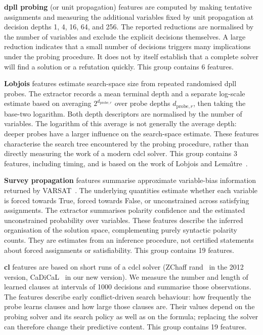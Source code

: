 \noindent\textbf{\gls{dpll} probing} (or unit propagation) features are computed by making tentative assignments and measuring the additional variables fixed by unit propagation at decision depths 1, 4, 16, 64, and 256. The reported reductions are normalised by the number of variables and exclude the explicit decisions themselves. A large reduction indicates that a small number of decisions triggers many implications under the probing procedure. It does not by itself establish that a complete solver will find a solution or a refutation quickly. This group contains 6 features.

\noindent\textbf{Lobjois} features estimate search-space size from repeated randomised \gls{dpll} probes. The extractor records a mean terminal depth and a separate log-scale estimate based on averaging $2^{d_{\mathrm{probe},r}}$ over probe depths $d_{\mathrm{probe},r}$, then taking the base-two logarithm. Both depth descriptors are normalised by the number of variables. The logarithm of this average is not generally the average depth: deeper probes have a larger influence on the search-space estimate. These features characterise the search tree encountered by the probing procedure, rather than directly measuring the work of a modern \gls{cdcl} solver. This group contains 3 features, including timing, and is based on the work of Lobjois and Lema\^{\i}tre~\cite{LobLem98}.

\noindent\textbf{Survey propagation} features summarise approximate variable-bias information returned by VARSAT~\cite{HsuMcI09}. The underlying quantities estimate whether each variable is forced towards True, forced towards False, or unconstrained across satisfying assignments. The extractor summarises polarity confidence and the estimated unconstrained probability over variables. These features describe the inferred organisation of the solution space, complementing purely syntactic polarity counts. They are estimates from an inference procedure, not certified statements about forced assignments or satisfiability. This group contains 19 features.

\noindent\textbf{\Gls{cl}} features are based on short runs of a \gls{cdcl} solver (ZChaff rand~\cite{MahEtAl04} in the 2012 version, CaDiCaL~\cite{BieEtAl20} in our new version). We measure the number and length of learned clauses at intervals of 1000 decisions and summarise those observations. The features describe early conflict-driven search behaviour: how frequently the probe learns clauses and how large those clauses are. Their values depend on the probing solver and its search policy as well as on the formula; replacing the solver can therefore change their predictive content. This group contains 19 features.

